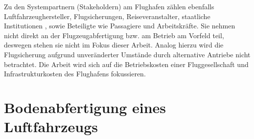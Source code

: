 %
Zu den Systempartnern (Stakeholdern) am Flughafen zählen ebenfalls Luftfahrzeughersteller, Flugsicherungen, 
Reiseveranstalter, staatliche Institutionen \cite{maertens2023neue},
sowie Beteiligte wie Passagiere und Arbeitskräfte. 
Sie nehmen nicht direkt an der Flugzeugabfertigung bzw. am Betrieb am Vorfeld teil, 
deswegen stehen sie nicht im Fokus dieser Arbeit.
Analog hierzu wird die Flugsicherung aufgrund unveränderter Umstände
durch alternative Antriebe nicht betrachtet. 
Die Arbeit wird sich auf die Betriebskosten einer Fluggesellschaft 
und Infrastrukturkosten des Flughafens fokussieren.
%
%
%
%
%
%
%
%
\section{Bodenabfertigung eines Luftfahrzeugs}
\label{s:Bodenabfertigung eines Luftfahrzeugs}

